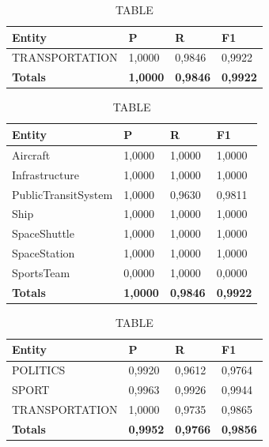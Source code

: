 \documentclass[thesis=M,english]{FITthesis}[2018/05/30]
\begin{document}
	
	\begin{table}[H]\centering
		\caption{TABLE}
		\label{}
		\begin{tabular}{|l|l|l|l|}
			\hline {\textbf{Entity}} & {\textbf{P}} & {\textbf{R}} & {\textbf{F1}}\\\hline
				TRANSPORTATION & 1,0000 & 0,9846 & 0,9922\\\hline
				\textbf{Totals} & \textbf{1,0000} & \textbf{0,9846} & \textbf{0,9922}\\\hline
		\end{tabular}
	\end{table}	

	\begin{table}[H]\centering
		\caption{TABLE}
		\label{}
		\begin{tabular}{|l|l|l|l|}
			\hline {\textbf{Entity}} & {\textbf{P}} & {\textbf{R}} & {\textbf{F1}}\\\hline
				Aircraft & 1,0000 & 1,0000 & 1,0000\\
				Infrastructure & 1,0000 & 1,0000 & 1,0000\\
				PublicTransitSystem & 1,0000 & 0,9630 & 0,9811\\
				Ship & 1,0000 & 1,0000 & 1,0000\\				
				SpaceShuttle & 1,0000 & 1,0000 & 1,0000\\
				SpaceStation & 1,0000 & 1,0000 & 1,0000\\
				SportsTeam & 0,0000 & 1,0000 & 0,0000\\\hline
				\textbf{Totals} & \textbf{1,0000} & \textbf{0,9846} & \textbf{0,9922}\\\hline
		\end{tabular}
	\end{table}	




	\begin{table}[H]\centering
		\caption{TABLE}
		\label{}
		\begin{tabular}{|l|l|l|l|}
			\hline {\textbf{Entity}} & {\textbf{P}} & {\textbf{R}} & {\textbf{F1}}\\\hline
				POLITICS & 0,9920 & 0,9612 & 0,9764\\
				SPORT & 0,9963 & 0,9926 & 0,9944\\
				TRANSPORTATION & 1,0000 & 0,9735 & 0,9865\\\hline
				\textbf{Totals} & \textbf{0,9952} & \textbf{0,9766} & \textbf{0,9856}\\\hline
		\end{tabular}
	\end{table}
\end{document}
